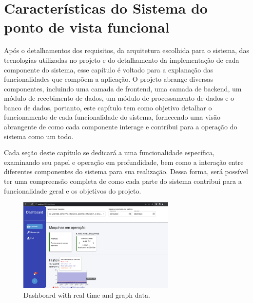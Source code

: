 

\chapter{Características do Sistema do ponto de vista funcional}\label{cap:functions}

Após o detalhamentos dos requisitos, da arquitetura escolhida para o sistema, das tecnologias utilizadas no projeto e do detalhamento da implementação de cada componente do sistema, esse capítulo é voltado para a explanação das funcionalidades que compõem a aplicação. O projeto abrange diversas componentes, incluindo uma camada de frontend, uma camada de backend, um módulo de recebimento de dados, um módulo de processamento de dados e o banco de dados, portanto, este capítulo tem como objetivo detalhar o funcionamento de cada funcionalidade do sistema, fornecendo uma visão abrangente de como cada componente interage e contribui para a operação do sistema como um todo.

Cada seção deste capítulo se dedicará a uma funcionalidade específica, examinando seu papel e operação em profundidade, bem como a interação entre diferentes componentes do sistema para sua realização. Dessa forma, será possível ter uma compreensão completa de como cada parte do sistema contribui para a funcionalidade geral e os objetivos do projeto.

\begin{figure}[htbp]
	\centering
	\includegraphics[width=0.7\textwidth]{images/dashboard.png}
	\caption{Dashboard with real time and graph data.}
	\label{fig:dashboradPage}
\end{figure}

